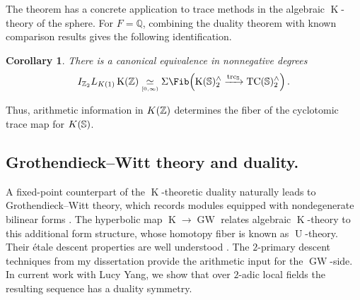 \documentclass[11pt]{article}
\newtheorem{corollary}[theorem]{Corollary}
\newcommand{\K}{\operatorname{K}}
\newcommand{\GW}{\operatorname{GW}}
\begin{document}
The theorem has a concrete application to trace methods in the algebraic $\K$-theory of the sphere.
For $F=\mathbb Q$, combining the duality theorem with known comparison results gives the following identification.
\begin{corollary}
There is a canonical equivalence in nonnegative degrees
\begin{equation*}
I_{\bZ_2}L_{K(1)}\K(\bZ) \mathrel{\underset{\scriptscriptstyle [0,\infty)}{\simeq}} \Sigma \Fib\!\left( \K(\bS)_2^\w \xrightarrow{\operatorname{trc}_{\bS}} \operatorname{TC}(\bS)_2^\w \right).
\end{equation*}
\end{corollary}
Thus, arithmetic information in $K(\mathbb{Z})$ determines the fiber of the cyclotomic trace map for $K(\mathbb{S})$.


\subsection{Grothendieck--Witt theory and  duality.}
A fixed-point counterpart of the $\K$-theoretic duality naturally leads to Grothendieck--Witt theory, which records modules equipped with nondegenerate bilinear forms \cite{CDH}.
The hyperbolic map $\K\to\GW$ relates algebraic $\K$-theory to this additional form structure, whose homotopy fiber is known as $\operatorname{U}$-theory.
Their étale descent properties are well understood \cite{MR3341783,MR2811711}.
The $2$-primary descent techniques from my dissertation provide the arithmetic input for the $\GW$-side.
In current work with Lucy Yang, we show that over $2$-adic local fields the resulting sequence has a duality symmetry.
\end{document}
